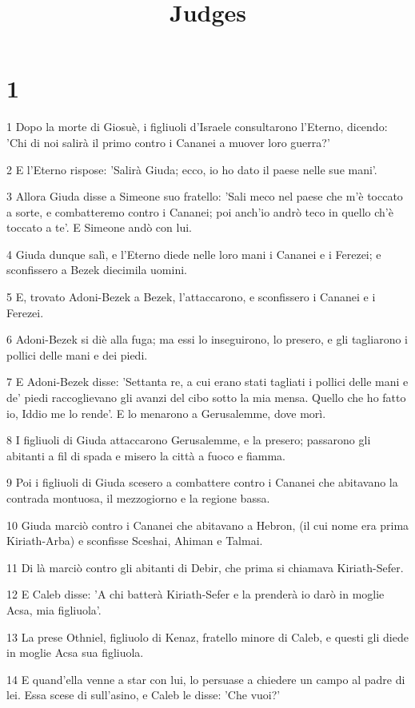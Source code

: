 

\title{Judges}


\chapter{1}

\par 1 Dopo la morte di Giosuè, i figliuoli d'Israele consultarono l'Eterno, dicendo: 'Chi di noi salirà il primo contro i Cananei a muover loro guerra?'
\par 2 E l'Eterno rispose: 'Salirà Giuda; ecco, io ho dato il paese nelle sue mani'.
\par 3 Allora Giuda disse a Simeone suo fratello: 'Sali meco nel paese che m'è toccato a sorte, e combatteremo contro i Cananei; poi anch'io andrò teco in quello ch'è toccato a te'. E Simeone andò con lui.
\par 4 Giuda dunque salì, e l'Eterno diede nelle loro mani i Cananei e i Ferezei; e sconfissero a Bezek diecimila uomini.
\par 5 E, trovato Adoni-Bezek a Bezek, l'attaccarono, e sconfissero i Cananei e i Ferezei.
\par 6 Adoni-Bezek si diè alla fuga; ma essi lo inseguirono, lo presero, e gli tagliarono i pollici delle mani e dei piedi.
\par 7 E Adoni-Bezek disse: 'Settanta re, a cui erano stati tagliati i pollici delle mani e de' piedi raccoglievano gli avanzi del cibo sotto la mia mensa. Quello che ho fatto io, Iddio me lo rende'. E lo menarono a Gerusalemme, dove morì.
\par 8 I figliuoli di Giuda attaccarono Gerusalemme, e la presero; passarono gli abitanti a fil di spada e misero la città a fuoco e fiamma.
\par 9 Poi i figliuoli di Giuda scesero a combattere contro i Cananei che abitavano la contrada montuosa, il mezzogiorno e la regione bassa.
\par 10 Giuda marciò contro i Cananei che abitavano a Hebron, (il cui nome era prima Kiriath-Arba) e sconfisse Sceshai, Ahiman e Talmai.
\par 11 Di là marciò contro gli abitanti di Debir, che prima si chiamava Kiriath-Sefer.
\par 12 E Caleb disse: 'A chi batterà Kiriath-Sefer e la prenderà io darò in moglie Acsa, mia figliuola'.
\par 13 La prese Othniel, figliuolo di Kenaz, fratello minore di Caleb, e questi gli diede in moglie Acsa sua figliuola.
\par 14 E quand'ella venne a star con lui, lo persuase a chiedere un campo al padre di lei. Essa scese di sull'asino, e Caleb le disse: 'Che vuoi?'
